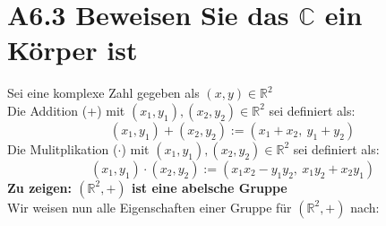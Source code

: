 \documentclass{article}
\begin{document}
    \section*{A6.3 Beweisen Sie das \( \mathbb{C} \) ein Körper ist}
    Sei eine komplexe Zahl gegeben als \( (x, y) \in \mathbb{R}^2 \) \\
    Die Addition (+) mit \( (x_1, y_1), (x_2, y_2) \in \mathbb{R}^2 \) sei definiert als: \\
    \[ (x_1, y_1) + (x_2, y_2) := (x_1 + x_2, \ y_1 + y_2) \]
    Die Mulitplikation (\( \cdot \)) mit \( (x_1, y_1), (x_2, y_2) \in \mathbb{R}^2 \) sei definiert als: \\
    \[ (x_1, y_1) \cdot (x_2, y_2) := (x_1 x_2 - y_1 y_2, \ x_1 y_2 + x_2 y_1) \]
    \textbf{Zu zeigen: \( (\mathbb{R}^2, +) \) ist eine abelsche Gruppe } \\
    Wir weisen nun alle Eigenschaften einer Gruppe für \( (\mathbb{R}^2, +) \) nach:
\end{document}
